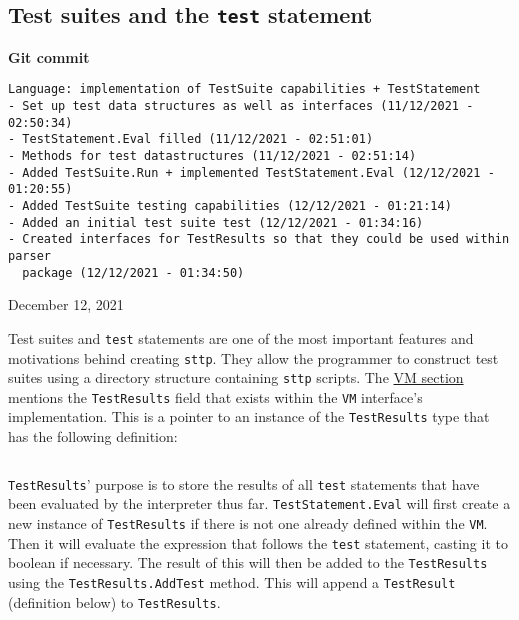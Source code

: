 \cprotect\subsection{Test suites and the \verb|test| statement}

\begin{center}
    \textbf{Git commit}
    \begin{verbatim}
Language: implementation of TestSuite capabilities + TestStatement
- Set up test data structures as well as interfaces (11/12/2021 - 02:50:34)
- TestStatement.Eval filled (11/12/2021 - 02:51:01)
- Methods for test datastructures (11/12/2021 - 02:51:14)
- Added TestSuite.Run + implemented TestStatement.Eval (12/12/2021 - 01:20:55)
- Added TestSuite testing capabilities (12/12/2021 - 01:21:14)
- Added an initial test suite test (12/12/2021 - 01:34:16)
- Created interfaces for TestResults so that they could be used within parser
  package (12/12/2021 - 01:34:50)
    \end{verbatim}
    \vspace{-1em}
    \tiny{December 12, 2021}
\end{center}

Test suites and \verb|test| statements are one of the most important features and motivations behind creating \verb|sttp|. They allow the programmer to construct test suites using a directory structure containing \verb|sttp| scripts. The \hyperref[sec:data-structures-vm]{VM section} mentions the \verb|TestResults| field that exists within the \verb|VM| interface's implementation. This is a pointer to an instance of the \verb|TestResults| type that has the following definition:

\inputminted[firstline=29, lastline=35, autogobble, breaklines, tabsize=4]{go}{../../src/test.go}

\verb|TestResults|' purpose is to store the results of all \verb|test| statements that have been evaluated by the interpreter thus far. \verb|TestStatement.Eval| will first create a new instance of \verb|TestResults| if there is not one already defined within the \verb|VM|. Then it will evaluate the expression that follows the \verb|test| statement, casting it to boolean if necessary. The result of this will then be added to the \verb|TestResults| using the \verb|TestResults.AddTest| method. This will append a \verb|TestResult| (definition below) to \verb|TestResults|.

\inputminted[firstline=21, lastline=27, autogobble, breaklines, tabsize=4]{go}{../../src/test.go}

